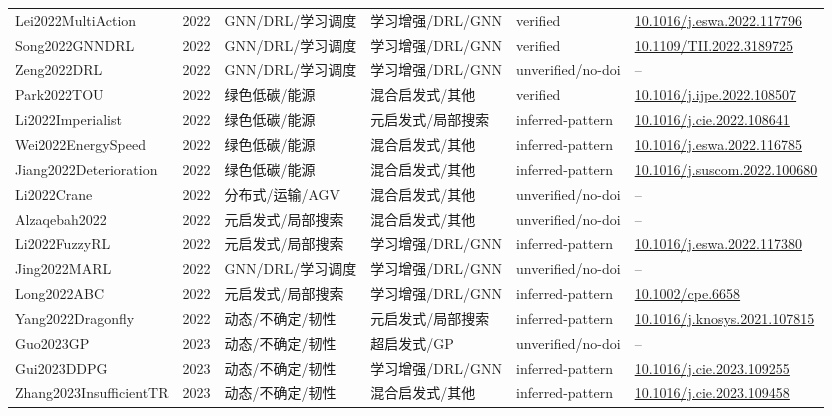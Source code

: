 \documentclass[UTF8,a4paper,11pt]{ctexart}
\begin{document}
\begin{landscape}
\begin{longtable}{>{\raggedright\arraybackslash}p{5.0cm}p{0.8cm}>{\raggedright\arraybackslash}p{2.6cm}>{\raggedright\arraybackslash}p{2.8cm}>{\raggedright\arraybackslash}p{2.6cm}>{\raggedright\arraybackslash}p{5.4cm}}
Lei2022MultiAction & 2022 & GNN/DRL/学习调度 & 学习增强/DRL/GNN & verified & \href{https://doi.org/10.1016/j.eswa.2022.117796}{10.1016/j.eswa.2022.117796} \\
Song2022GNNDRL & 2022 & GNN/DRL/学习调度 & 学习增强/DRL/GNN & verified & \href{https://doi.org/10.1109/TII.2022.3189725}{10.1109/TII.2022.3189725} \\
Zeng2022DRL & 2022 & GNN/DRL/学习调度 & 学习增强/DRL/GNN & unverified/no-doi & -- \\
Park2022TOU & 2022 & 绿色低碳/能源 & 混合启发式/其他 & verified & \href{https://doi.org/10.1016/j.ijpe.2022.108507}{10.1016/j.ijpe.2022.108507} \\
Li2022Imperialist & 2022 & 绿色低碳/能源 & 元启发式/局部搜索 & inferred-pattern & \href{https://doi.org/10.1016/j.cie.2022.108641}{10.1016/j.cie.2022.108641} \\
Wei2022EnergySpeed & 2022 & 绿色低碳/能源 & 混合启发式/其他 & inferred-pattern & \href{https://doi.org/10.1016/j.eswa.2022.116785}{10.1016/j.eswa.2022.116785} \\
Jiang2022Deterioration & 2022 & 绿色低碳/能源 & 混合启发式/其他 & inferred-pattern & \href{https://doi.org/10.1016/j.suscom.2022.100680}{10.1016/j.suscom.2022.100680} \\
Li2022Crane & 2022 & 分布式/运输/AGV & 混合启发式/其他 & unverified/no-doi & -- \\
Alzaqebah2022 & 2022 & 元启发式/局部搜索 & 混合启发式/其他 & unverified/no-doi & -- \\
Li2022FuzzyRL & 2022 & 元启发式/局部搜索 & 学习增强/DRL/GNN & inferred-pattern & \href{https://doi.org/10.1016/j.eswa.2022.117380}{10.1016/j.eswa.2022.117380} \\
Jing2022MARL & 2022 & GNN/DRL/学习调度 & 学习增强/DRL/GNN & unverified/no-doi & -- \\
Long2022ABC & 2022 & 元启发式/局部搜索 & 学习增强/DRL/GNN & inferred-pattern & \href{https://doi.org/10.1002/cpe.6658}{10.1002/cpe.6658} \\
Yang2022Dragonfly & 2022 & 动态/不确定/韧性 & 元启发式/局部搜索 & inferred-pattern & \href{https://doi.org/10.1016/j.knosys.2021.107815}{10.1016/j.knosys.2021.107815} \\
Guo2023GP & 2023 & 动态/不确定/韧性 & 超启发式/GP & unverified/no-doi & -- \\
Gui2023DDPG & 2023 & 动态/不确定/韧性 & 学习增强/DRL/GNN & inferred-pattern & \href{https://doi.org/10.1016/j.cie.2023.109255}{10.1016/j.cie.2023.109255} \\
Zhang2023InsufficientTR & 2023 & 动态/不确定/韧性 & 混合启发式/其他 & inferred-pattern & \href{https://doi.org/10.1016/j.cie.2023.109458}{10.1016/j.cie.2023.109458} \\

\end{longtable}
\end{landscape}
\end{document}
